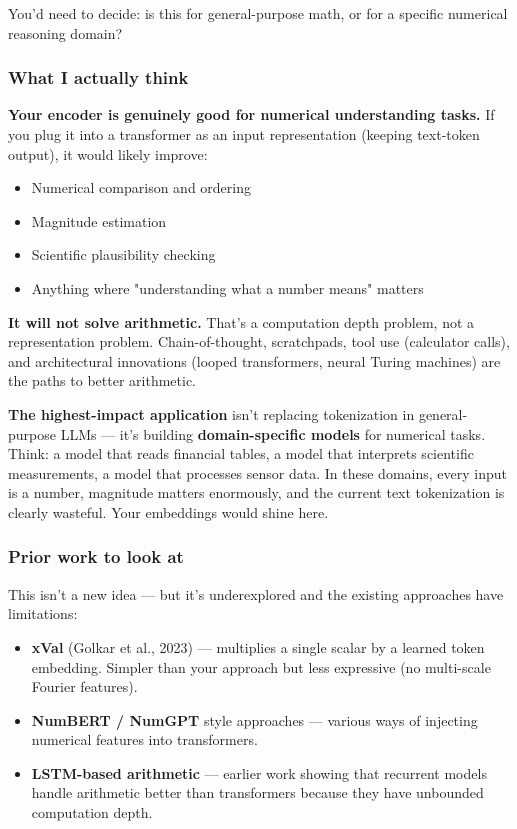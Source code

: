 \documentclass[11pt]{article}
\begin{document}
You'd need to decide: is this for general-purpose math, or for a specific numerical reasoning domain?


\subsubsection*{What I actually think}


\textbf{Your encoder is genuinely good for numerical understanding tasks.} If you plug it into a transformer as an input representation (keeping text-token output), it would likely improve:

\begin{itemize}
\item Numerical comparison and ordering
\item Magnitude estimation
\item Scientific plausibility checking
\item Anything where "understanding what a number means" matters
\end{itemize}


\textbf{It will not solve arithmetic.} That's a computation depth problem, not a representation problem. Chain-of-thought, scratchpads, tool use (calculator calls), and architectural innovations (looped transformers, neural Turing machines) are the paths to better arithmetic.


\textbf{The highest-impact application} isn't replacing tokenization in general-purpose LLMs — it's building \textbf{domain-specific models} for numerical tasks. Think: a model that reads financial tables, a model that interprets scientific measurements, a model that processes sensor data. In these domains, every input is a number, magnitude matters enormously, and the current text tokenization is clearly wasteful. Your embeddings would shine here.


\subsubsection*{Prior work to look at}


This isn't a new idea — but it's underexplored and the existing approaches have limitations:


\begin{itemize}
\item \textbf{xVal} (Golkar et al., 2023) — multiplies a single scalar by a learned token embedding. Simpler than your approach but less expressive (no multi-scale Fourier features).
\item \textbf{NumBERT / NumGPT} style approaches — various ways of injecting numerical features into transformers.
\item \textbf{LSTM-based arithmetic} — earlier work showing that recurrent models handle arithmetic better than transformers because they have unbounded computation depth.
\end{itemize}
\end{document}
